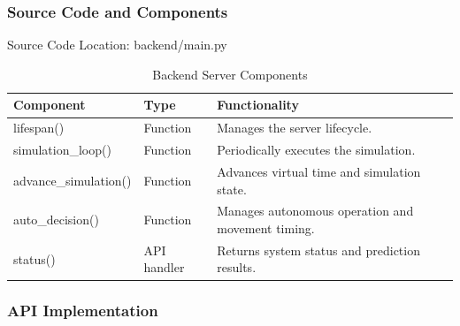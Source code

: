 \documentclass[conference]{IEEEtran}
\newlength{\tablebodywidth}
\begin{document}
\subsubsection{Source Code and Components}

Source Code Location: backend/main.py

\begin{table}[!t]
\caption{Backend Server Components}
\label{tab:t7}
\centering\footnotesize
\setlength{\tabcolsep}{3pt}
\setlength{\tablebodywidth}{\dimexpr\columnwidth-18pt\relax}
\begin{tabular}{>{\raggedright\arraybackslash}p{0.370\tablebodywidth}>{\raggedright\arraybackslash}p{0.200\tablebodywidth}>{\raggedright\arraybackslash}p{0.430\tablebodywidth}}
\toprule
\textbf{Component} & \textbf{Type} & \textbf{Functionality} \\
\midrule
lifespan() & Function & Manages the server lifecycle. \\
simulation\_\allowbreak{}loop() & Function & Periodically executes the simulation. \\
advance\_\allowbreak{}simulation() & Function & Advances virtual time and simulation state. \\
auto\_\allowbreak{}decision() & Function & Manages autonomous operation and movement timing. \\
status() & API handler & Returns system status and prediction results. \\
\bottomrule
\end{tabular}
\end{table}

\subsubsection{API Implementation}
\end{document}
